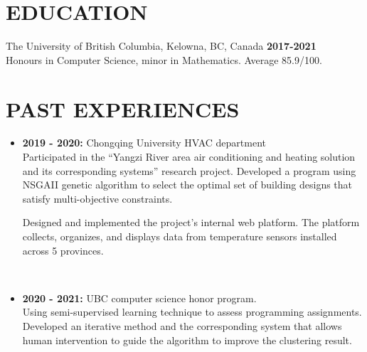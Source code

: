 \documentclass{res}
\begin{document}

\address{\textbf{Email:} jimmy123good@hotmail.com \\
        \textbf{Github: }https://github.com/ailrk \\
         \textbf{Blog:}    https://ailrk.github.io/home \\
         \textbf{Linkedin:} https://www.linkedin.com/in/jinyang-yao-649549208 \\
         \textbf{Contact:}  +1 (250) 899 2600}
\begin{resume}

\section{EDUCATION}
The University of British Columbia, Kelowna, BC, Canada  \hspace{1.2in} \textbf{2017-2021}\\
    Honours in Computer Science, minor in Mathematics. Average 85.9/100. \\

\vspace{-0.2in}
\section{PAST EXPERIENCES}
\begin{itemize}[leftmargin=-.1in]
    \item \textbf{2019 - 2020:} Chongqing University HVAC department
      \vspace{0.05in}\\ Participated in the ``Yangzi River area air conditioning and heating solution and its corresponding systems'' research project. Developed a program using NSGAII genetic algorithm to select the optimal set of building designs that satisfy multi-objective constraints.

      Designed and implemented the project's internal web platform. The platform collects, organizes, and displays data from temperature sensors installed across 5 provinces.

     \\
    \item \textbf{2020 - 2021: } UBC computer science honor program. \\
        Using semi-supervised learning technique to assess programming assignments. Developed an iterative method and the corresponding system that allows human intervention to guide the algorithm to improve the clustering result. \\


\end{itemize}
\end{resume}
\end{document}
